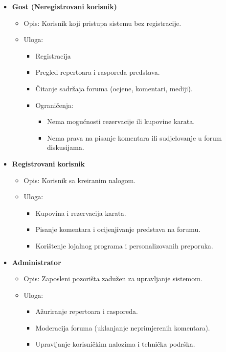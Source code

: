 \begin{itemize}
    \item \textbf{Gost (Neregistrovani korisnik)} 
    \begin{itemize}
        \item Opis: Korisnik koji pristupa sistemu bez registracije.
        \item Uloga: 
            \begin{itemize}
                \item Registracija
                \item Pregled repertoara i rasporeda predstava.
                \item Čitanje sadržaja foruma (ocjene, komentari, mediji).
                \item Ograničenja: 
                    \begin{itemize}
                        \item Nema mogućnosti rezervacije ili kupovine karata.
                        \item Nema prava na pisanje komentara ili sudjelovanje u forum diskusijama.
                    \end{itemize}
            \end{itemize}
    \end{itemize}
    
    \item \textbf{Registrovani korisnik}
    \begin{itemize}
        \item Opis: Korisnik sa kreiranim nalogom.
        \item Uloga: 
            \begin{itemize}
                \item Kupovina i rezervacija karata.
                \item Pisanje komentara i ocijenjivanje predstava na forumu.
                \item Korištenje lojalnog programa i personalizovanih preporuka.
            \end{itemize}
    \end{itemize}
    
    \item \textbf{Administrator}
    \begin{itemize}
        \item Opis: Zaposleni pozorišta zadužen za upravljanje sistemom.
        \item Uloga: 
            \begin{itemize}
                \item Ažuriranje repertoara i rasporeda.
                \item Moderacija foruma (uklanjanje neprimjerenih komentara).
                \item Upravljanje korisničkim nalozima i tehnička podrška.
            \end{itemize}
    \end{itemize}
\end{itemize}

